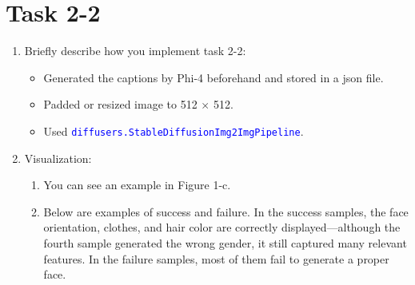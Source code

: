 \documentclass{article}
\begin{document}
\section*{Task 2-2}
\begin{enumerate}
	\item Briefly describe how you implement task 2-2:
		\begin{itemize}
			\item Generated the captions by Phi-4 beforehand and stored in a json file.
			\item Padded or resized image to 512 $\times$ 512.
			\item Used \textcolor{blue}{\texttt{diffusers.StableDiffusionImg2ImgPipeline}}.
		\end{itemize}
	\item Visualization:
		\begin{enumerate}
			\item You can see an example in Figure 1-c.
			\item Below are examples of success and failure. In the success samples, the face orientation, clothes, and hair color are correctly displayed—although the fourth sample generated the wrong gender, it still captured many relevant features. In the failure samples, most of them fail to generate a proper face.
				\begin{figure}[h!]
					\centering
					\begin{minipage}{0.8\textwidth}
						\centering


\end{minipage}
\end{figure}
\end{enumerate}
\end{enumerate}
\end{document}
